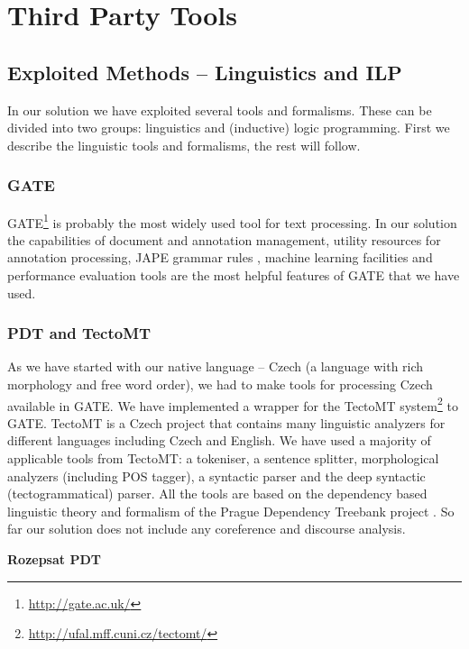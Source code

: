 \chapter{Third Party Tools}


\section{Exploited Methods -- Linguistics and ILP}
In our solution we have exploited several tools and formalisms. These can be divided into two groups: linguistics and (inductive) logic programming. First we describe the linguistic tools and formalisms, the rest will follow.

\subsection{GATE}
GATE\footnote{\url{http://gate.ac.uk/}} \citep{dedek:GATE_ACL2002} is probably the most widely used tool for text processing. In our solution the capabilities of document and annotation management, utility resources for annotation processing, JAPE grammar rules \citep{Cunningham00jape:a}, machine learning facilities and performance evaluation tools are the most helpful features of GATE that we have used.

\subsection{PDT and TectoMT}
As we have started with our native language -- Czech (a language with rich morphology and free word order), we had to make tools for processing Czech available in GATE. We have implemented a wrapper for the TectoMT system\footnote{\url{http://ufal.mff.cuni.cz/tectomt/}} \citep{dedek:ZaPtTectoMTHighly2008} to GATE. TectoMT is a Czech project that contains many linguistic analyzers for different languages including Czech and English. We have used a majority of applicable tools from TectoMT: a tokeniser, a sentence splitter, morphological analyzers (including POS tagger), a syntactic parser and the deep syntactic (tectogrammatical) parser. All the tools are based on the dependency based linguistic theory and formalism of the Prague Dependency Treebank project \citep{dedek:PDT20_CD}. So far our solution does not include any coreference and discourse analysis.


\textbf{Rozepsat PDT}




